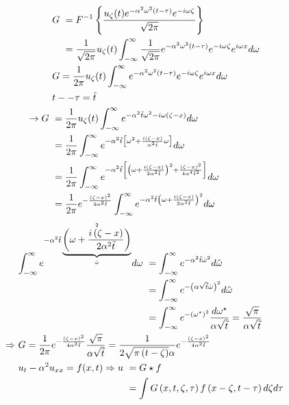\begin{equation*}
	\begin{aligned}
		&\
		\begin{aligned}
		G &\ =
		F^{-1}\left\{\frac{u_{\zeta}(t)e^{-\alpha^2\omega^2\left(t-\tau\right)}e^{-i\omega\zeta}}{\sqrt{2\pi}}\right\}
		\\ &\
		= \frac1{\sqrt{2\pi}}u_{\zeta}(t)\int_{-\infty}^\infty\frac1{\sqrt{2\pi}}e^{-\alpha^2\omega^2\left(t-\tau\right)}e^{-i\omega\zeta}e^{i\omega x}d\omega
		\end{aligned}
		\\ &\
		G=\frac1{2\pi}u_{\zeta}(t)\int_{-\infty}^\infty e^{-\alpha^2\omega^2\left(t-\tau\right)}e^{-i\omega\zeta}e^{i\omega x}d\omega
		\\ &\
		t--\tau=\tilde{t}
		\\
		\rightarrow G &\
		=\frac1{2\pi}u_{\zeta}(t)\int_{-\infty}^\infty e^{-\alpha^2\tilde{t}\omega^2-i\omega\left(\zeta-x\right)}d\omega
		\\ &\
		=\frac1{2\pi}\int_{-\infty}^\infty e^{-\alpha^2\tilde{t}\left[
			\omega^2+\frac{i\left(\zeta-x\right)}{\alpha^2\tilde{t}}\omega
			\right]}
		d\omega
		\\ &\
		= \frac1{2\pi}\int_{-\infty}^\infty e^{
			-\alpha^2\tilde{t}\left[
			\left(\omega+\frac{i\left(\zeta-x\right)}{2\alpha^2 \tilde{t}}\right)^2
			+
			\frac{\left(\zeta-x\right)^2}{4\alpha^4 \tilde{t}^2}
			\right]}d\omega
		\\ &\
		=\frac1{2\pi}e^{-\frac{\left(\zeta-x\right)^2}{4\alpha^2\tilde{t}}}\int_{-\infty}^\infty e^{-\alpha^2\tilde{t}\left(\omega+\frac{i\left(\zeta-x\right)}{2\alpha^2\tilde{t}}\right)^2}d\omega
	\end{aligned}
\end{equation*}
\begin{equation*}
	\begin{aligned}
	&\
	\begin{aligned}
		\int_{-\infty}^\infty e^{-\alpha^2\tilde{t}\underbrace{\left(\omega+\frac{i\left(\zeta-x\right)}{2\alpha^2\tilde{t}}\right)}_{\hat{\omega}}^2}d\omega &\ =
		\int_{-\infty}^\infty e^{-\alpha^2\tilde{t}\hat{\omega}^2}d\hat{\omega}
		\\ &\
		=\int_{-\infty}^\infty e^{-\left(\alpha\sqrt{\tilde{t}}\hat{\omega}\right)^2}d\hat{\omega}
		\\ &\
		=\int_{-\infty}^\infty e^{-\left(\omega^\star\right)^2}\frac{d\omega^\star}{\alpha\sqrt{\tilde{t}}}=\frac{\sqrt\pi}{\alpha\sqrt{\tilde{t}}}
	\end{aligned}
	\\ \Rightarrow &\
	G=\frac1{2\pi}e^{-\frac{\left(\zeta-x\right)^2}{4\alpha^2\tilde{t}}}\frac{\sqrt\pi}{\alpha\sqrt{\tilde t}}=\frac1{2\sqrt{\pi\left(t-\zeta\right)}\alpha}e^{-\frac{\left(\zeta-x\right)^2}{4\alpha^2\tilde{t}}}
	\\ &\
	\begin{aligned}
			u_t-\alpha^2u_{xx}=f(x,t)\Rightarrow u &\ = G\star f
			\\ &\
			= \int G\left(x,t,\zeta,\tau\right)f\left(x-\zeta,t-\tau\right)d\zeta d\tau
	\end{aligned}
	\end{aligned}
\end{equation*}